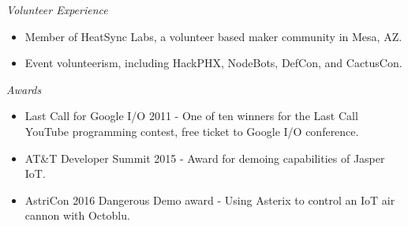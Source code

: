 \documentclass[line,margin]{res}
\begin{document}
\begin{resume}

          \emph{Volunteer Experience}
          \begin{itemize} \itemsep -2pt %
          \item
            Member of HeatSync Labs, a volunteer based maker community in Mesa, AZ.
          \item
            Event volunteerism, including HackPHX, NodeBots, DefCon, and CactusCon.
          \end{itemize}

          \emph{Awards}
          \begin{itemize} \itemsep -2pt
          \item
            Last Call for Google I/O 2011 - One of ten winners for the Last Call YouTube programming contest, free ticket to Google I/O conference.
          \item
            AT\&T Developer Summit 2015 - Award for demoing capabilities of Jasper IoT.
          \item
            AstriCon 2016 Dangerous Demo award - Using Asterix to control an IoT air cannon with Octoblu.
          \end{itemize}

\end{resume}
\end{document}
